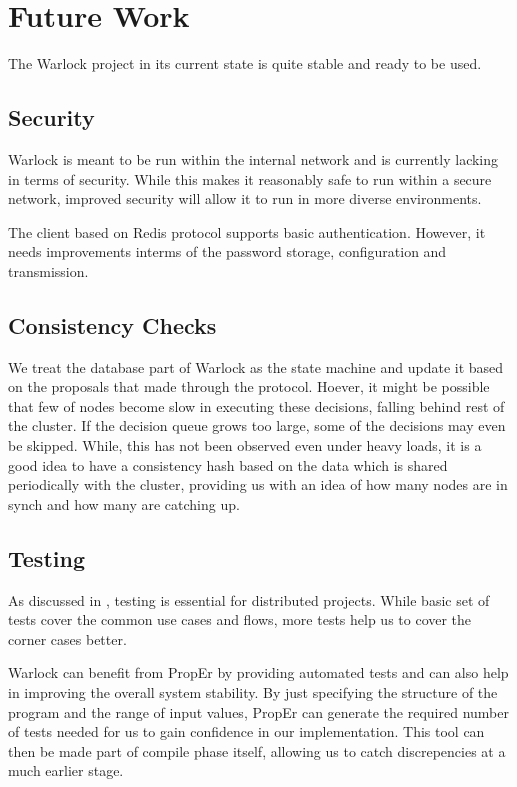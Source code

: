 \chapter{Future Work}
\label{chapter:future.work}

The Warlock project in its current state is quite stable and ready to be used.%


\section{Security}

Warlock is meant to be run within the internal network and is currently lacking
in terms of security. While this makes it reasonably safe to run within a secure
network, improved security will allow it to run in more diverse environments.

The client based on Redis protocol supports basic authentication. However, it
needs improvements interms of the password storage, configuration and
transmission.

\section{Consistency Checks}

We treat the database part of Warlock as the state machine and update it based
on the proposals that made through the protocol. Hoever, it might be possible
that few of nodes become slow in executing these decisions, falling behind
rest of the cluster. If the decision queue grows too large, some of the
decisions may even be skipped. While, this has not been observed even under
heavy loads, it is a good idea to have a consistency hash based on the data
which is shared periodically with the cluster, providing us with an idea of
how many nodes are in synch and how many are catching up.

\section{Testing}

As discussed in , testing is essential for distributed
projects. While basic set of tests cover the common use cases and flows, more
tests help us to cover the corner cases better.

Warlock can benefit from PropEr%
by providing automated tests and can also help in improving the overall
system stability. By just specifying the structure of the program and the range
of input values, PropEr can generate the required number of tests needed for
us to gain confidence in our implementation. This tool can then be made
part of compile phase itself, allowing us to catch discrepencies at a much
earlier stage.


